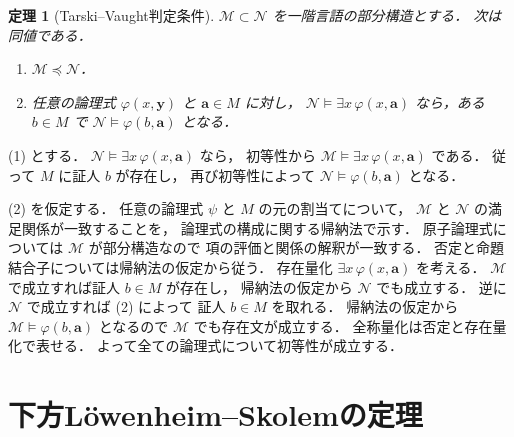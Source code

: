 \documentclass[a5paper,10pt,onecolumn]{jsarticle}
\makeatletter
\theoremstyle{mathnotetheorem}
\newtheorem{theorem}{定理}[section]
\renewcommand{\proofname}{証明}
\renewenvironment{proof}[1][\proofname]{%
  \par\pushQED{\qed}\normalfont\topsep4\p@\@plus2\p@\relax
  \trivlist\item[\hskip\labelsep\bfseries #1]\ignorespaces
}{\popQED\endtrivlist\@endpefalse}
\makeatother
\begin{document}
\begin{theorem}[Tarski--Vaught判定条件]\label{thm:tarski-vaught}
$\mathcal M\subset\mathcal N$ を一階言語の部分構造とする．
次は同値である．
\begin{enumerate}
\item $\mathcal M\preccurlyeq\mathcal N$．
\item 任意の論理式 $\varphi(x,\boldsymbol y)$ と
$\boldsymbol a\in M$ に対し，
$\mathcal N\models\exists x\,\varphi(x,\boldsymbol a)$
なら，ある $b\in M$ で
$\mathcal N\models\varphi(b,\boldsymbol a)$ となる．
\end{enumerate}
\end{theorem}
\begin{proof}
(1) とする．
$\mathcal N\models\exists x\,\varphi(x,\boldsymbol a)$ なら，
初等性から
$\mathcal M\models\exists x\,\varphi(x,\boldsymbol a)$ である．
従って $M$ に証人 $b$ が存在し，
再び初等性によって
$\mathcal N\models\varphi(b,\boldsymbol a)$ となる．

(2) を仮定する．
任意の論理式 $\psi$ と $M$ の元の割当てについて，
$\mathcal M$ と $\mathcal N$ の満足関係が一致することを，
論理式の構成に関する帰納法で示す．
原子論理式については $\mathcal M$ が部分構造なので
項の評価と関係の解釈が一致する．
否定と命題結合子については帰納法の仮定から従う．
存在量化 $\exists x\,\varphi(x,\boldsymbol a)$ を考える．
$\mathcal M$ で成立すれば証人 $b\in M$ が存在し，
帰納法の仮定から $\mathcal N$ でも成立する．
逆に $\mathcal N$ で成立すれば (2) によって
証人 $b\in M$ を取れる．
帰納法の仮定から $\mathcal M\models\varphi(b,\boldsymbol a)$
となるので $\mathcal M$ でも存在文が成立する．
全称量化は否定と存在量化で表せる．
よって全ての論理式について初等性が成立する．
\end{proof}

\section{下方L\"owenheim--Skolemの定理}
\end{document}
